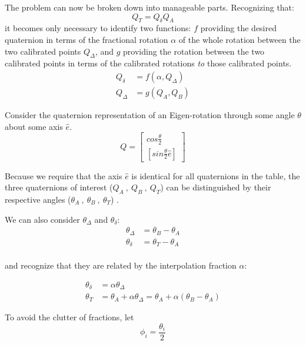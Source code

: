 \documentclass[11pt,fleqn]{report}
\begin{document}
The problem can now be broken down into manageable parts.  Recognizing that:
\begin{equation}
 Q_T = Q_\delta Q_A
\end{equation}
it becomes only necessary to identify two functions: $f$ providing the desired
quaternion in terms of the fractional rotation $\alpha$ of the whole rotation
between the two calibrated points $Q_\Delta$, and $g$ providing the rotation
between the two calibrated points in terms of the calibrated rotations
\textit{to} those calibrated points.
\begin{align*}
 Q_\delta & = f(\alpha, Q_\Delta) \\
 Q_\Delta & = g(Q_A, Q_B)
\end{align*}

Consider the quaternion representation of an Eigen-rotation through some angle
$\theta$ about some axis $\hat e$.
\begin{equation*}
 Q = \begin{bmatrix} cos \frac{\theta}{2} \\
                     \left[ sin \frac{\theta}{2} \hat e \right]
     \end{bmatrix}
\end{equation*}

Because we require that the axis $\hat e$ is identical for all quaternions in
the table, the three quaternions of interest ($Q_A ~,~ Q_B ~,~ Q_T$) can be
distinguished by their respective angles ($\theta_A ~,~ \theta_B ~,~ \theta_T$)
.

We can also consider $\theta_\Delta$ and $\theta_\delta$:
\begin{align*}
 \theta_\Delta & = \theta_B - \theta_A \\
 \theta_\delta & = \theta_T - \theta_A \\
\end{align*}

and recognize that they are related by the interpolation fraction $\alpha$:

\begin{align*}
 \theta_\delta & = \alpha \theta_\Delta \\
 \theta_T &= \theta_A + \alpha \theta_\Delta =
             \theta_A + \alpha (\theta_B - \theta_A)
\end{align*}

To avoid the clutter of fractions, let
\begin{equation*}
 \phi_i = \frac {\theta_i}{2}
\end{equation*}
\end{document}
